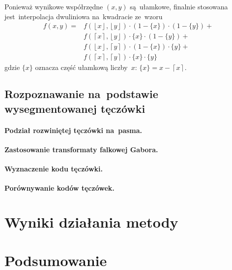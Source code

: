 \documentclass[11pt,a4paper]{article}
\begin{document}
Ponieważ wynikowe współrzędne $(x,y)$ są~ułamkowe, finalnie stosowana jest~interpolacja dwuliniowa na~kwadracie ze~wzoru
\begin{align*}
    f(x, y) = & f(\left\lfloor x \right\rfloor, \left\lfloor y \right\rfloor) \cdot (1 - \{ x \}) \cdot (1 - \{ y \}) + \\
    & f(\left\lceil x \right\rceil, \left\lfloor y \right\rfloor) \cdot \{ x \} \cdot (1 - \{ y \}) + \\
    & f(\left\lfloor x \right\rfloor, \left\lceil y \right\rceil) \cdot (1 - \{ x \}) \cdot \{ y \} + \\
    & f(\left\lceil x \right\rceil, \left\lceil y \right\rceil) \cdot \{ x \} \cdot \{ y \}
\end{align*}
gdzie $\{ x \}$ oznacza część ułamkową liczby~$x$: $\{ x \} = x - \left\lceil x \right\rceil$.

\subsection{Rozpoznawanie na~podstawie wysegmentowanej tęczówki}
\label{subsec:recognition}

\paragraph{Podział rozwiniętej tęczówki na~pasma.}

\paragraph{Zastosowanie transformaty falkowej Gabora.}

\paragraph{Wyznaczenie kodu tęczówki.}

\paragraph{Porównywanie kodów tęczówek.}

\section{Wyniki działania metody}

\section{Podsumowanie}
\end{document}
